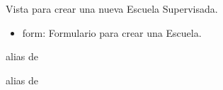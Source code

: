 \documentclass[letterpaper,10pt,spanish]{sphinxmanual}
\begin{document}
\begin{fulllineitems}

\pysigstartsignatures
{}
\pysigstopsignatures
\sphinxAtStartPar
Vista para crear una nueva Escuela Supervisada.
\begin{description}
\begin{itemize}
\item {} 
\sphinxAtStartPar
form: Formulario para crear una Escuela.

\end{itemize}

\end{description}


\begin{fulllineitems}

\pysigstartsignatures
{}
\pysigstopsignatures
\sphinxAtStartPar
alias de 

\end{fulllineitems}



\begin{fulllineitems}

\pysigstartsignatures
{}
\pysigstopsignatures
\sphinxAtStartPar
alias de 

\end{fulllineitems}



\begin{fulllineitems}

\pysigstartsignatures
{}
\pysigstopsignatures
\end{fulllineitems}



\begin{fulllineitems}

\pysigstartsignatures
{}
\pysigstopsignatures
\end{fulllineitems}


\end{fulllineitems}
\end{document}
